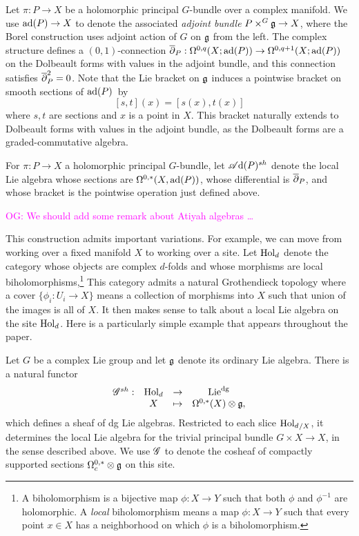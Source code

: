 \documentclass[10pt]{amsart}
\def\sAd{\sA{\rm d}}
\def\owen{\textcolor{magenta}{OG: }\textcolor{magenta}}
\begin{document}
Let $\pi : P \to X$ be a holomorphic principal $G$-bundle over a complex manifold.
We use ${\rm ad}(P) \to X$ to denote the associated {\em adjoint bundle} $P \times^{G} \mathfrak g \to X$, 
where the Borel construction uses adjoint action of $G$ on $\mathfrak g$ from the left. 
The complex structure defines a $(0,1)$-connection $\overline{\partial}_P : \Omega^{0,q}(X ; {\rm ad}(P)) \to \Omega^{0,q+1}(X ; {\rm ad}(P))$
on the Dolbeault forms with values in the adjoint bundle,
and this connection satisfies $\overline{\partial}_P^2 = 0$.
Note that the Lie bracket on $\mathfrak g$ induces a pointwise bracket on smooth sections of ${\rm ad}(P)$~by
\[
[s,t](x) = [s(x),t(x)]
\]
where $s, t$ are sections and $x$ is a point in $X$.
This bracket naturally extends to Dolbeault forms with values in the adjoint bundle,
as the Dolbeault forms are a graded-commutative algebra.

\begin{dfn}
For $\pi : P \to X$ a holomorphic principal $G$-bundle,
let $\sAd(P)^{sh}$ denote the local Lie algebra whose sections are $\Omega^{0,*}(X,{\rm ad}(P))$,
whose differential is $\overline{\partial}_P$, and whose bracket is the pointwise operation just defined above.
\end{dfn}

\owen{We should add some remark about Atiyah algebras \dots}

This construction admits important variations.
For example, we can move from working over a fixed manifold $X$ to working over a site.
Let ${\rm Hol}_d$ denote the category whose objects are complex $d$-folds and whose morphisms are local biholomorphisms,\footnote{A biholomorphism is a bijective map $\phi: X \to Y$ such that both $\phi$ and $\phi^{-1}$ are holomorphic. A {\em local} biholomorphism means a map $\phi: X \to Y$ such that every point $x \in X$ has a neighborhood on which $\phi$ is a biholomorphism.}
This category admits a natural Grothendieck topology where a cover $\{\phi_i: U_i \to X\}$ means a collection of morphisms into $X$ such that union of the images is all of $X$.
It then makes sense to talk about a local Lie algebra on the site ${\rm Hol}_d$.
Here is a particularly simple example that appears throughout the paper.

\begin{dfn}
Let $G$ be a complex Lie group and let $\mathfrak g$ denote its ordinary Lie algebra.
There is a natural functor 
\[
\begin{array}{cccc}
\mathscr G^{sh} :&  {\rm Hol}_d & \to & {\rm Lie}^{\rm dg}\\
& X & \mapsto &\Omega^{0,*}(X) \otimes \mathfrak g,
\end{array}
\]
which defines a sheaf of dg Lie algebras.
Restricted to each slice ${{\rm Hol}_d}_{/X}$, it determines the local Lie algebra for the trivial principal bundle $G \times X \to X$, in the sense described above.
We use $\mathscr G$ to denote the cosheaf of compactly supported sections $\Omega^{0,*}_c \otimes \mathfrak g$ on this site.
\end{dfn}
\end{document}
